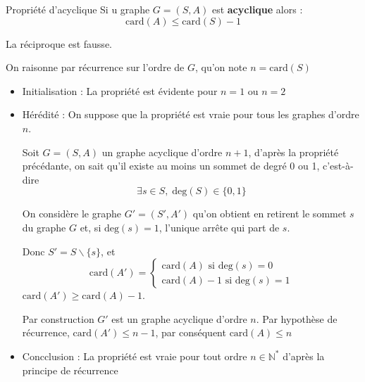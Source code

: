   \begin{Corollary}{Propriété d'acyclique}{} \label{Cor:Pro d'acyclique}
  Si u graphe $G = (S,A)$ est \textbf{acyclique} alors :
  \[
  \boxed{  \mathrm{card}(A) \le \mathrm{card}(S) - 1}
  \]

  La réciproque est fausse.
  \end{Corollary}

  \begin{myproof}
  On raisonne par récurrence sur l'ordre de $G$, qu'on note $n = \mathrm{car d}(S)$

  \begin{itemize}
      \item Initialisation : La propriété est évidente pour $n=1$ ou $n=2$

      \item Hérédité : On suppose que la propriété est vraie pour tous les graphes d'ordre $n$.

          Soit $G = (S,A)$ un graphe acyclique d'ordre $n+1$, d'après la propriété précédante, on sait qu'il existe au moins un sommet de degré 0 ou 1, c'est-à-dire  
          \[
              \exists  s \in S, \; \mathrm{deg} (S) \in \{0,1\}
          \]
         
          On considère le graphe $G' = (S', A')$ qu'on obtient en retirent le sommet  $s$ du graphe $G$ et, si $\mathrm{deg} (s)=1$, l'unique arrête qui part de $s$. 

          Donc $S'= S \backslash \{s\}$, et 
          \[
          \mathrm{car d}(A') = \begin{cases}
              \mathrm{car d}(A) \text{ si } \mathrm{deg} (s) = 0 \\
              \mathrm{car d}(A) - 1 \text{ si } \mathrm{deg}(s) = 1  
          \end{cases} 
          \]
         $\mathrm{car d}(A') \ge   \mathrm{car d} (A) -1$.

         Par construction $G'$ est un graphe acyclique d'ordre  $n$. Par hypothèse de récurrence, $\mathrm{car d}(A') \le  n-1$, par conséquent $\mathrm{car d} (A) \le n$ 

      \item Concclusion : La propriété est vraie pour tout ordre $n \in \mathbb{N} ^{*}$ d'après la principe de récurrence
  \end{itemize}


\end{myproof}

